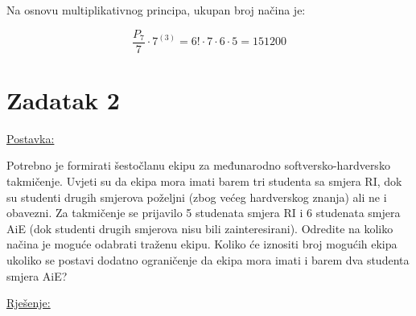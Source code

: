 \documentclass[12pt]{article}
\begin{document}
Na osnovu multiplikativnog principa, ukupan broj načina je:

$$\frac{P_{7}}{7} \cdot 7^{(3)} = 6! \cdot 7 \cdot 6 \cdot 5 = 151200$$

\section*{Zadatak 2\label{Z2}}

\underline{Postavka:}

Potrebno je formirati šestočlanu ekipu za međunarodno softversko-hardversko takmičenje. Uvjeti su da ekipa mora imati barem tri studenta sa smjera RI, dok su studenti drugih smjerova poželjni (zbog većeg hardverskog znanja) ali ne i obavezni. Za takmičenje se prijavilo 5 studenata smjera RI i 6 studenata smjera AiE (dok studenti drugih smjerova nisu bili zainteresirani). Odredite na koliko načina je moguće odabrati traženu ekipu. Koliko će iznositi broj mogućih ekipa ukoliko se postavi dodatno ograničenje da ekipa mora imati i barem dva studenta smjera AiE?

\underline{Rješenje:}\\
\end{document}
